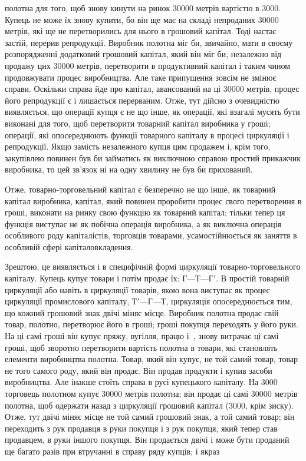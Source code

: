 \parcont{}  %
полотна для того, щоб знову кинути на ринок \num{30000} метрів вартістю в 3000. Купець
не може їх знову купити, бо він ще має на складі непроданих \num{30000} метрів, які ще
не перетворились для нього в грошовий капітал. Тоді настає
застій, перерив репродукції. Виробник полотна міг би, звичайно,
мати в своєму розпорядженні додатковий грошовий капітал, який
він міг би, незалежно від продажу цих \num{30000} метрів, перетворити
в продуктивний капітал і таким чином продовжувати процес
виробництва. Але таке припущення зовсім не змінює справи.
Оскільки справа йде про капітал, авансований на ці \num{30000} метрів,
процес його репродукції є і лишається перерваним. Отже, тут
дійсно з очевидністю виявляється, що операції купця є не що
інше, як операції, які взагалі мусять бути виконані для того, щоб
перетворити товарний капітал виробника у гроші; операції, які
опосереднюють функції товарного капіталу в процесі циркуляції і репродукції. Якщо замість
незалежного купця цим продажем і, крім того, закупівлею повинен був би займатись як виключною
справою простий прикажчик виробника, то цей зв’язок ні
на одну хвилину не був би прихований.

Отже, товарно-торговельний капітал є безперечно не що
інше, як товарний капітал виробника, капітал, який повинен проробити процес свого перетворення в
гроші, виконати на ринку
свою функцію як товарний капітал; тільки тепер ця функція виступає не як побічна операція виробника,
а як виключна операція особливого роду капіталістів, торговців товарами, усамостійнюється як заняття
в особливій сфері капіталовкладення.

Зрештою, це виявляється і в специфічній формі циркуляції
товарно-торговельного капіталу. Купець купує товари і потім
продає їх: $Г — Т — Г'$. В простій товарній циркуляції або навіть
в циркуляції товарів, якою вона виступає як процес циркуляції
промислового капіталу, $Т' — Г — Т$, циркуляція опосереднюється
тим, що кожний грошовий знак двічі міняє місце. Виробник полотна продає свій товар, полотно,
перетворює його в гроші;
гроші покупця переходять у його руки. На ці самі гроші він
купує пряжу, вугілля, працю і~, знову витрачає ці самі
гроші, щоб зворотно перетворити вартість полотна в товари, які
становлять елементи виробництва полотна. Товар, який він купує, не той самий товар, товар не того
самого роду, який
він продає. Він продав продукти і купив засоби виробництва. Але
інакше стоїть справа в русі купецького капіталу. На 3000 торговець полотном купує
\num{30000} метрів полотна;
він продає ці самі \num{30000} метрів полотна, щоб одержати назад
з циркуляції грошовий капітал (3000, крім
зиску). Отже, тут двічі міняє місце не той самий грошовий знак,
а той самий товар; він переходить з рук продавця в руки покупця і з рук покупця, який тепер став
продавцем, в руки
іншого покупця. Він продається двічі і може бути проданий
ще багато разів при втручанні в справу ряду купців; і якраз
\parbreak{}  %
